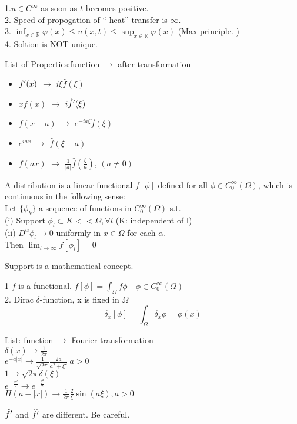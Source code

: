 \begin{remark}
1.$u\in C^\infty$ as soon as $t$ becomes positive.\\
2. Speed of propogation of `` heat'' transfer is $\infty$.\\
3. $\inf_{x\in\mathbb{R}}\varphi(x)\leq u(x,t)\leq \sup_{x\in\mathbb{R}}\varphi(x)$ (Max principle. )\\
4. Soltion is NOT unique.

\end{remark}

List of Properties:function $\rightarrow$ after transformation
\begin{itemize}
\item $f^{\prime}(x)$ $\rightarrow$  $i\xi\hat{f}(\xi)$\\
\item $xf(x)$  $\rightarrow$  $i\hat{f}^{\prime}(\xi)$\\
\item $f(x-a)$  $\rightarrow$  $e^{-ia\xi}\hat{f}(\xi)$\\
\item $e^{iax}$  $\rightarrow$  $ \hat{f}(\xi-a)$\\
\item $f(ax)$  $\rightarrow$  $\frac{1}{|a|}\hat{f}(\frac{\xi}{a})$, $(a\neq0)$
\end{itemize}
\begin{definition}
A distribution is a linear functional $f[\phi]$ defined for all $\phi\in C_0^\infty(\Omega)$, which is continuous in the following sense:\\
Let $\{\phi_k\}$ a sequence of functions in $C_0^\infty(\Omega)$ s.t. \\
(i) Support $\phi_l\subset K<< \Omega, \forall l$ (K: independent of l)\\
(ii) $D^\alpha\phi_l\rightarrow 0$ uniformly in $x\in \Omega$ for each $\alpha$.\\
Then $\lim_{l\rightarrow\infty}f[\phi_l]=0$
\end{definition}
\begin{remark}
Support is a mathematical concept.
\end{remark}
\begin{example}
1 $f$ is a functional. $f[\phi]=\int_\Omega f\phi\quad \phi\in C_0^\infty(\Omega)$\\
2. Dirac $\delta$-function, x is fixed in $\Omega$
\[\delta_x[\phi]=\int_\Omega\delta_x\phi=\phi(x)
\]
\end{example}
List: function $\rightarrow$ Fourier transformation\\
$\delta(x)\rightarrow \frac{1}{2\pi}$\\
$e^{-a|x|}\rightarrow\frac{1}{\sqrt{2\pi}}\frac{2a}{a^2+\xi^2}~a>0$\\
$1\rightarrow\sqrt{2\pi}\delta(\xi)$\\
$e^{-\frac{x^2}{2}}\rightarrow e^{-\frac{\xi^2}{2}}$\\
$H(a-|x|)\rightarrow \frac{1}{2\pi}\frac{2}{\xi}\sin(a\xi), a>0$
\begin{remark}
$\hat{f}^{\prime}$ and $\widehat{f^{\prime}}$ are different. Be careful.

\end{remark}

